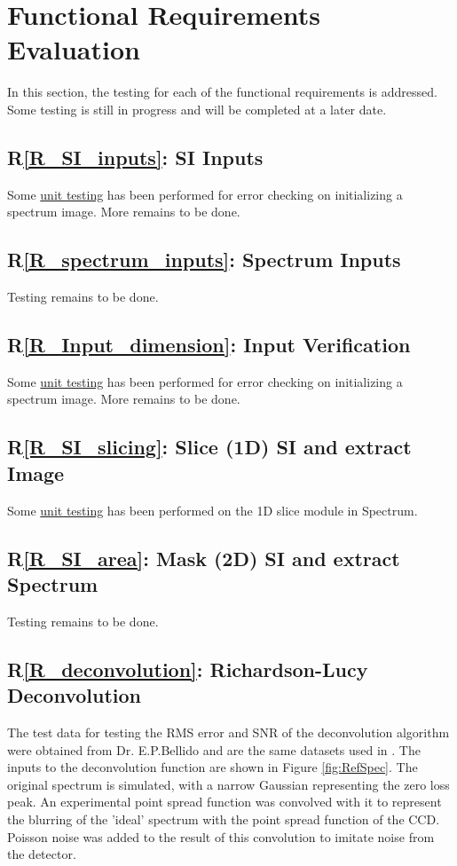 \documentclass[12pt, titlepage]{article}
\newcommand{\rref}[1]{R\ref{#1}}
\begin{document}
\section{Functional Requirements Evaluation}
In this section, the testing for each of the functional requirements is
addressed. Some testing is still in progress and will be completed at a later
date.
\subsection{\rref{R_SI_inputs}: SI Inputs}
Some \hyperref[sec:UnitTest]{unit testing} has been performed for error checking
on initializing a spectrum image. More remains to be done.

\subsection{\rref{R_spectrum_inputs}: Spectrum Inputs}
Testing remains to be done.

\subsection{\rref{R_Input_dimension}: Input Verification}
Some \hyperref[sec:UnitTest]{unit testing} has been performed for error checking
on initializing a spectrum image. More remains to be done.

\subsection{\rref{R_SI_slicing}: Slice (1D) SI and extract Image}
Some \hyperref[sec:UnitTest]{unit testing} has been performed on the 1D slice
module in Spectrum.

\subsection{\rref{R_SI_area}: Mask (2D) SI and extract Spectrum}
Testing remains to be done.

\subsection{\rref{R_deconvolution}: Richardson-Lucy Deconvolution \label{ssec:RLDeconv}}
The test data for testing the RMS error and SNR of the deconvolution algorithm
were obtained from Dr. E.P.Bellido and are the same datasets used in
\cite{bellido_toward_2014}. The inputs to the deconvolution function are shown
in Figure \ref{fig:RefSpec}. The original spectrum is simulated, with a narrow
Gaussian representing the zero loss peak. An experimental point spread function
was convolved with it to represent the blurring of the 'ideal' spectrum with the
point spread function of the CCD. Poisson noise was added to the result of this
convolution to imitate noise from the detector.
\end{document}
